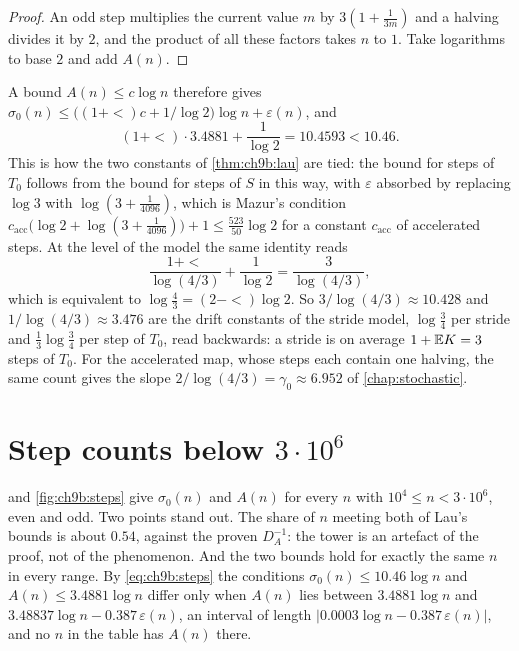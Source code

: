 \begin{proof}
An odd step multiplies the current value $m$ by $3(1+\frac1{3m})$ and a halving divides it by $2$, and the product of all these factors takes $n$ to $1$. Take logarithms to base $2$ and add $A(n)$.
\end{proof}

A bound $A(n)\le c\log n$ therefore gives $\sigma_0(n)\le\bigl((1+\lt)c+1/\log2\bigr)\log n+\varepsilon(n)$, and
\[
  (1+\lt)\cdot3.4881+\frac1{\log2}=10.4593<10.46 .
\]
This is how the two constants of \cref{thm:ch9b:lau} are tied: the bound for steps of $T_0$ follows from the bound for steps of $S$ in this way, with $\varepsilon$ absorbed by replacing $\log3$ with $\log(3+\frac1{4096})$, which is Mazur's condition $c_{\mathrm{acc}}\bigl(\log2+\log(3+\frac1{4096})\bigr)+1\le\frac{523}{50}\log2$ for a constant $c_{\mathrm{acc}}$ of accelerated steps. At the level of the model the same identity reads
\[
  \frac{1+\lt}{\log(4/3)}+\frac1{\log2}=\frac3{\log(4/3)},
\]
which is equivalent to $\log\frac43=(2-\lt)\log2$. So $3/\log(4/3)\approx10.428$ and $1/\log(4/3)\approx3.476$ are the drift constants of the stride model, $\log\frac34$ per stride and $\frac13\log\frac34$ per step of $T_0$, read backwards: a stride is on average $1+\mathbb{E} K=3$ steps of $T_0$. For the accelerated map, whose steps each contain one halving, the same count gives the slope $2/\log(4/3)=\gamma_0\approx6.952$ of \cref{chap:stochastic}.

\section{Step counts below \texorpdfstring{$3\cdot10^6$}{3 million}}\label{sec:ch9b:steps}

 and \cref{fig:ch9b:steps} give $\sigma_0(n)$ and $A(n)$ for every $n$ with $10^4\le n<3\cdot10^6$, even and odd. Two points stand out. The share of $n$ meeting both of Lau's bounds is about $0.54$, against the proven $D_A^{-1}$: the tower is an artefact of the proof, not of the phenomenon. And the two bounds hold for exactly the same $n$ in every range. By \eqref{eq:ch9b:steps} the conditions $\sigma_0(n)\le10.46\log n$ and $A(n)\le3.4881\log n$ differ only when $A(n)$ lies between $3.4881\log n$ and $3.48837\log n-0.387\,\varepsilon(n)$, an interval of length $|0.0003\log n-0.387\,\varepsilon(n)|$, and no $n$ in the table has $A(n)$ there.

